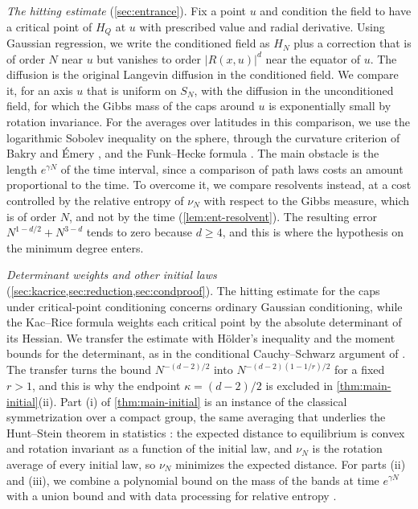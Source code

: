 \emph{The hitting estimate} (\cref{sec:entrance}). Fix a point $u$ and condition the field to have a critical point of $H_Q$ at $u$ with prescribed value and radial derivative. Using Gaussian regression, we write the conditioned field as $H_N$ plus a correction that is of order $N$ near $u$ but vanishes to order $|R(x,u)|^d$ near the equator of $u$. The diffusion is the original Langevin diffusion in the conditioned field. We compare it, for an axis $u$ that is uniform on $S_N$, with the diffusion in the unconditioned field, for which the Gibbs mass of the caps around $u$ is exponentially small by rotation invariance. For the averages over latitudes in this comparison, we use the logarithmic Sobolev inequality on the sphere, through the curvature criterion of Bakry and \'Emery \cite{BakryEmery1985}, and the Funk--Hecke formula \cite{AtkinsonHan2012}. The main obstacle is the length $e^{\gamma N}$ of the time interval, since a comparison of path laws costs an amount proportional to the time. To overcome it, we compare resolvents instead, at a cost controlled by the relative entropy of $\nu_N$ with respect to the Gibbs measure, which is of order $N$, and not by the time (\cref{lem:ent-resolvent}). The resulting error $N^{1-d/2}+N^{3-d}$ tends to zero because $d\ge4$, and this is where the hypothesis on the minimum degree enters.

\emph{Determinant weights and other initial laws} (\cref{sec:kacrice,sec:reduction,sec:condproof}). The hitting estimate for the caps under critical-point conditioning concerns ordinary Gaussian conditioning, while the Kac--Rice formula weights each critical point by the absolute determinant of its Hessian. We transfer the estimate with H\"older's inequality and the moment bounds for the determinant, as in the conditional Cauchy--Schwarz argument of \cite[Corollary~3.16]{HuangSellke2024}. The transfer turns the bound $N^{-(d-2)/2}$ into $N^{-(d-2)(1-1/r)/2}$ for a fixed $r>1$, and this is why the endpoint $\kappa=(d-2)/2$ is excluded in \cref{thm:main-initial}(ii). Part (i) of \cref{thm:main-initial} is an instance of the classical symmetrization over a compact group, the same averaging that underlies the Hunt--Stein theorem in statistics \cite[Section~8.5]{LehmannRomano2005}: the expected distance to equilibrium is convex and rotation invariant as a function of the initial law, and $\nu_N$ is the rotation average of every initial law, so $\nu_N$ minimizes the expected distance. For parts (ii) and (iii), we combine a polynomial bound on the mass of the bands at time $e^{\gamma N}$ with a union bound and with data processing for relative entropy \cite[Theorem~2.17]{PolyanskiyWu2025}.


